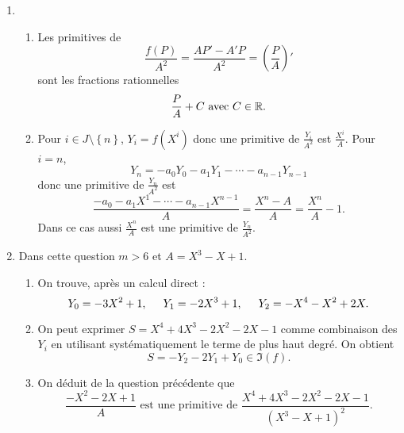 \begin{enumerate}
\item \begin{enumerate}
 \item Les primitives de
\begin{displaymath}
 \frac{f(P)}{A^2} = \frac{AP'-A'P}{A^2}=\left(\frac{P}{A} \right)' 
\end{displaymath}
sont les fractions rationnelles 
\begin{displaymath}
 \frac{P}{A} + C \text{ avec } C \in \mathbb{R}.
\end{displaymath}
\item Pour $i\in J \setminus \left\lbrace n \right\rbrace $, $Y_i = f(X^i)$ donc une primitive de $\frac{Y_i}{A^2}$ est $\frac{X^i}{A}$.\newline
Pour $i = n$,
\begin{displaymath}
 Y_n = -a_0Y_0 - a_1Y_1 - \cdots - a_{n-1}Y_{n-1} 
\end{displaymath}
donc une primitive de $\frac{Y_n}{A^2}$ est 
\[
 \frac{-a_0 - a_1X^1 - \cdots - a_{n-1}X^{n-1}}{A} = \frac{X^n - A}{A} = \frac{X^n}{A} -1.
\]
Dans ce cas aussi $\frac{X^n}{A}$ est une primitive de $\frac{Y_n}{A^2}$.
\end{enumerate}

\item Dans cette question $m > 6$ et $A=X^3 - X +1$.
\begin{enumerate}
 \item On trouve, après un calcul direct :
\[
 Y_0 = -3X^2 + 1 , \hspace{0.5cm}
 Y_1 = -2X^3 + 1 , \hspace{0.5cm}
 Y_2 = -X^4 -X^2 +2X.
\]
\item On peut exprimer $S=X^{4}+4X^{3}-2X^{2}-2X-1$ comme combinaison des $Y_i$ en utilisant systématiquement le terme de plus haut degré. On obtient
\begin{displaymath}
 S = -Y_2 -2Y_1 + Y_0 \in \Im(f).
\end{displaymath}
\item On déduit de la question précédente que
\begin{displaymath}
 \frac{-X^2-2X+1}{A} \text{ est une primitive de } \frac{ X^{4}+4X^{3}-2X^{2}-2X-1}{(X^{3}-X+1)^{2}}.
\end{displaymath}


\end{enumerate}
\end{enumerate}
